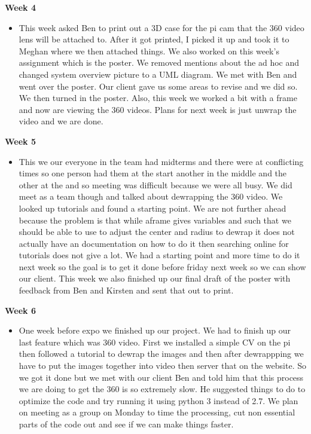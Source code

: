 \documentclass[onecolumn, draftclsnofoot,10pt, compsoc]{IEEEtran}
\begin{document}
            \textbf{Week 4}
            \begin{itemize}
                \item This week asked Ben to print out a 3D case for the pi cam that the 360 video lens will be attached to. After it got printed, I picked it up and took it to Meghan where we then attached things. We also worked on this week’s assignment which is the poster. We removed mentions about the ad hoc and changed system overview picture to a UML diagram. We met with Ben and went over the poster. Our client gave us some areas to revise and we did so. We then turned in the poster. Also, this week we worked a bit with a frame and now are viewing the 360 videos. Plans for next week is just unwrap the video and we are done.  
            \end{itemize}
            \newpage
            \textbf{Week 5}
            \begin{itemize}
                \item This we our everyone in the team had midterms and there were at conflicting times so one person had them at the start another in the middle and the other at the and so meeting was difficult because we were all busy. We did meet as a team though and talked about dewrapping the 360 video. We looked up tutorials and found a starting point. We are not further ahead because the problem is that while aframe gives variables and such that we should be able to use to adjust the center and radius to dewrap it does not actually have an documentation on how to do it then searching online for tutorials does not give a lot. We had a starting point and more time to do it next week so the goal is to get it done before friday next week so we can show our client. This week we also finished up our final draft of the poster with feedback from Ben and Kirsten and sent that out to print.
            \end{itemize}
            
           \textbf{Week 6}
            \begin{itemize}
                \item One week before expo we finished up our project. We had to finish up our last feature which was 360 video. First we installed a simple CV on the pi then followed a tutorial to dewrap the images and then after dewrappping we have to put the images together into video then server that on the website. So we got it done but we met with our client Ben and told him that this process we are doing to get the 360 is so extremely slow. He suggested things to do to optimize the code and try running it using python 3 instead of 2.7. We plan on meeting as a group on Monday to time the processing, cut non essential parts of the code out and see if we can make things faster.
            \end{itemize}
            
\end{document}
